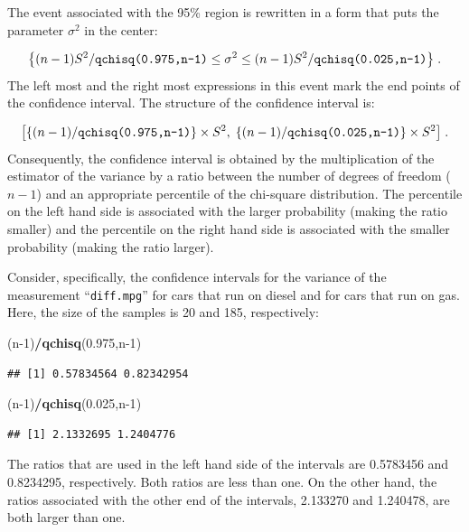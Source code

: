 \documentclass[]{krantz}
\makeatletter
\newenvironment{Shaded}{\begin{snugshade}}{\end{snugshade}}
\newcommand{\DecValTok}[1]{\textcolor[rgb]{0.00,0.00,0.81}{#1}}
\newcommand{\FloatTok}[1]{\textcolor[rgb]{0.00,0.00,0.81}{#1}}
\newcommand{\KeywordTok}[1]{\textcolor[rgb]{0.13,0.29,0.53}{\textbf{#1}}}
\newcommand{\NormalTok}[1]{#1}
\newcommand{\OperatorTok}[1]{\textcolor[rgb]{0.81,0.36,0.00}{\textbf{#1}}}
\newenvironment{kframe}{%
\medskip{}
\setlength{\fboxsep}{.8em}
 \def\at@end@of@kframe{}%
 \ifinner\ifhmode%
  \def\at@end@of@kframe{\end{minipage}}%
  \begin{minipage}{\columnwidth}%
 \fi\fi%
 \def\FrameCommand##1{\hskip\@totalleftmargin \hskip-\fboxsep
 \colorbox{shadecolor}{##1}\hskip-\fboxsep
     \hskip-\linewidth \hskip-\@totalleftmargin \hskip\columnwidth}%
 \MakeFramed {\advance\hsize-\width
   \@totalleftmargin\z@ \linewidth\hsize
   \@setminipage}}%
 {\par\unskip\endMakeFramed%
 \at@end@of@kframe}
\renewenvironment{Shaded}{\begin{kframe}}{\end{kframe}}
\theoremstyle{definition}
\theoremstyle{definition}
\theoremstyle{definition}
\theoremstyle{remark}
\makeatother
\begin{document}
The event associated with the 95\% region is rewritten in a form that
puts the parameter \(\sigma^2\) in the center:

\[\big\{(n-1)S^2/\mbox{\texttt{qchisq(0.975,n-1)}} \leq  \sigma^2  \leq (n-1)S^2/\mbox{\texttt{qchisq(0.025,n-1)}}\big\}\;.\]
The left most and the right most expressions in this event mark the end
points of the confidence interval. The structure of the confidence
interval is:

\[\big[\{(n-1)/\mbox{\texttt{qchisq(0.975,n-1)}}\}\times S^2,\;\{(n-1)/\mbox{\texttt{qchisq(0.025,n-1)}}\}\times S^2\big]\;.\]
Consequently, the confidence interval is obtained by the multiplication
of the estimator of the variance by a ratio between the number of
degrees of freedom (\(n-1\)) and an appropriate percentile of the
chi-square distribution. The percentile on the left hand side is
associated with the larger probability (making the ratio smaller) and
the percentile on the right hand side is associated with the smaller
probability (making the ratio larger).

Consider, specifically, the confidence intervals for the variance of the
measurement ``\texttt{diff.mpg}'' for cars that run on diesel and for cars that
run on gas. Here, the size of the samples is 20 and 185, respectively:

\begin{Shaded}
\begin{Highlighting}[]
\NormalTok{(n}\DecValTok{-1}\NormalTok{)}\OperatorTok{/}\KeywordTok{qchisq}\NormalTok{(}\FloatTok{0.975}\NormalTok{,n}\DecValTok{-1}\NormalTok{)}
\end{Highlighting}
\end{Shaded}

\begin{verbatim}
## [1] 0.57834564 0.82342954
\end{verbatim}

\begin{Shaded}
\begin{Highlighting}[]
\NormalTok{(n}\DecValTok{-1}\NormalTok{)}\OperatorTok{/}\KeywordTok{qchisq}\NormalTok{(}\FloatTok{0.025}\NormalTok{,n}\DecValTok{-1}\NormalTok{)}
\end{Highlighting}
\end{Shaded}

\begin{verbatim}
## [1] 2.1332695 1.2404776
\end{verbatim}

The ratios that are used in the left hand side of the intervals are
0.5783456 and 0.8234295, respectively. Both ratios are less than one. On
the other hand, the ratios associated with the other end of the
intervals, 2.133270 and 1.240478, are both larger than one.
\end{document}
